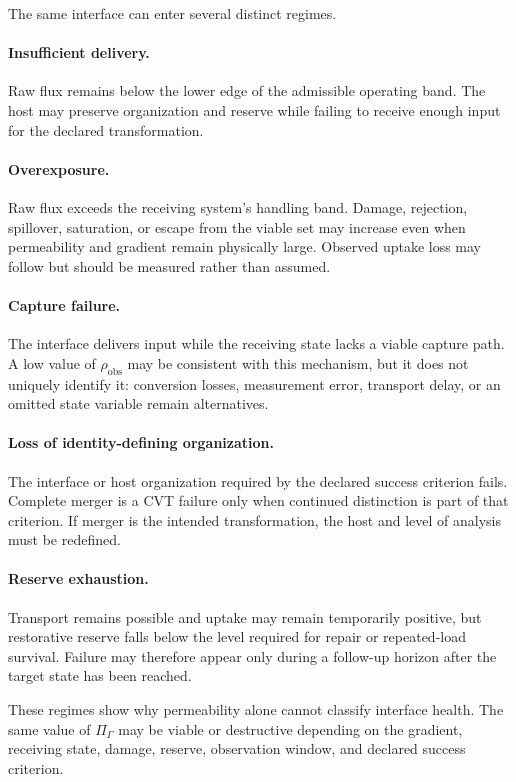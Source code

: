 \documentclass[11pt]{article}
\begin{document}
The same interface can enter several distinct regimes.

\paragraph{Insufficient delivery.}
Raw flux remains below the lower edge of the admissible operating band. The host may preserve organization and reserve while failing to receive enough input for the declared transformation.

\paragraph{Overexposure.}
Raw flux exceeds the receiving system's handling band. Damage, rejection, spillover, saturation, or escape from the viable set may increase even when permeability and gradient remain physically large. Observed uptake loss may follow but should be measured rather than assumed.

\paragraph{Capture failure.}
The interface delivers input while the receiving state lacks a viable capture path. A low value of \(\rho_{\mathrm{obs}}\) may be consistent with this mechanism, but it does not uniquely identify it: conversion losses, measurement error, transport delay, or an omitted state variable remain alternatives.

\paragraph{Loss of identity-defining organization.}
The interface or host organization required by the declared success criterion fails. Complete merger is a CVT failure only when continued distinction is part of that criterion. If merger is the intended transformation, the host and level of analysis must be redefined.

\paragraph{Reserve exhaustion.}
Transport remains possible and uptake may remain temporarily positive, but restorative reserve falls below the level required for repair or repeated-load survival. Failure may therefore appear only during a follow-up horizon after the target state has been reached.

These regimes show why permeability alone cannot classify interface health. The same value of \(\Pi_{\Gamma}\) may be viable or destructive depending on the gradient, receiving state, damage, reserve, observation window, and declared success criterion.
\end{document}
